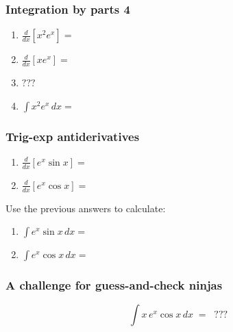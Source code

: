 \begin{frame}[t]
	\frametitle{Integration by parts 4}

	\begin{enumerate}
		\item $\displaystyle \frac{d}{dx}\left[ x^{2}e^{x}\right] =$
			\vspace{.1cm}
			\vspace{.1cm}

		\item $\displaystyle \frac{d}{dx}\left[ x e^{x}\right] =$
			\vspace{.5cm}

		\item $\displaystyle ???$
			\vspace{.5cm}

		\item $\displaystyle \int x^{2}e^{x}\, dx =$
	\end{enumerate}
\end{frame}

\begin{frame}[t]
	\frametitle{Trig-exp antiderivatives}

	\begin{enumerate}
		\item $\displaystyle \frac{d}{dx}\left[ e^{x}\sin x \right]=$
			\vspace{.1cm}
			\vspace{.1cm}

		\item $\displaystyle \frac{d}{dx}\left[ e^{x}\cos x \right]=$
	\end{enumerate}
	\vspace{.5cm}
	Use the previous answers to calculate:
	\vspace{.3cm}
	\begin{enumerate}
		\addtocounter{enumi}{2}

		\item $\displaystyle \int e^{x}\sin x \, dx =$
			\vspace{.1cm}
			\vspace{.1cm}

		\item $\displaystyle \int e^{x}\cos x \, dx =$
	\end{enumerate}
\end{frame}

\begin{frame}[t]
	\frametitle{A challenge for guess-and-check ninjas}
	\[
		\int x \, e^{x}\cos x \, dx \; = \; \; ???
	\]
\end{frame}

